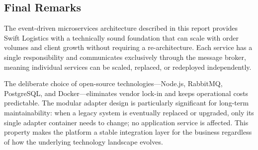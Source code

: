 \subsection{Final Remarks}

The event-driven microservices architecture described in this report provides Swift
Logistics with a technically sound foundation that can scale with order volumes and
client growth without requiring a re-architecture. Each service has a single
responsibility and communicates exclusively through the message broker, meaning
individual services can be scaled, replaced, or redeployed independently.

The deliberate choice of open-source technologies---Node.js, RabbitMQ, PostgreSQL,
and Docker---eliminates vendor lock-in and keeps operational costs predictable. The
modular adapter design is particularly significant for long-term maintainability:
when a legacy system is eventually replaced or upgraded, only its single adapter
container needs to change; no application service is affected. This property makes
the platform a stable integration layer for the business regardless of how the
underlying technology landscape evolves.
